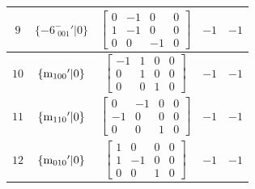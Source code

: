 \documentclass[fleqn,8pt]{jsarticle}
\begin{document}
\begin{longtable}{ccccc}
$ 9 $ & $ \{-6^{-}_{\,\,001}{}'|0\} $ & $ \begin{bmatrix} 0 & -1 & 0 & 0 \\ 1 & -1 & 0 & 0 \\ 0 & 0 & -1 & 0 \end{bmatrix} $ & $ -1 $ & $ -1 $ \\ \hline
$ 10 $ & $ \{{\rm m}_{100}{}'|0\} $ & $ \begin{bmatrix} -1 & 1 & 0 & 0 \\ 0 & 1 & 0 & 0 \\ 0 & 0 & 1 & 0 \end{bmatrix} $ & $ -1 $ & $ -1 $ \\ \hline
$ 11 $ & $ \{{\rm m}_{110}{}'|0\} $ & $ \begin{bmatrix} 0 & -1 & 0 & 0 \\ -1 & 0 & 0 & 0 \\ 0 & 0 & 1 & 0 \end{bmatrix} $ & $ -1 $ & $ -1 $ \\ \hline
$ 12 $ & $ \{{\rm m}_{010}{}'|0\} $ & $ \begin{bmatrix} 1 & 0 & 0 & 0 \\ 1 & -1 & 0 & 0 \\ 0 & 0 & 1 & 0 \end{bmatrix} $ & $ -1 $ & $ -1 $ \\
\end{longtable}
\end{document}
